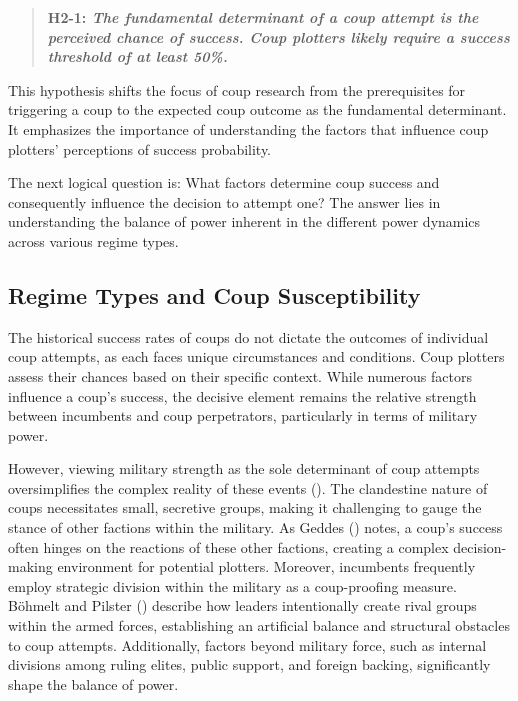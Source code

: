 \documentclass[
  12pt,
]{report}
\begin{document}
\begin{quote}
\textbf{H2-1: \emph{The fundamental determinant of a coup attempt is the
perceived chance of success. Coup plotters likely require a success
threshold of at least 50\%.}}
\end{quote}

This hypothesis shifts the focus of coup research from the prerequisites
for triggering a coup to the expected coup outcome as the fundamental
determinant. It emphasizes the importance of understanding the factors
that influence coup plotters' perceptions of success probability.

The next logical question is: What factors determine coup success and
consequently influence the decision to attempt one? The answer lies in
understanding the balance of power inherent in the different power
dynamics across various regime types.

\subsection{Regime Types and Coup
Susceptibility}\label{regime-types-and-coup-susceptibility}

The historical success rates of coups do not dictate the outcomes of
individual coup attempts, as each faces unique circumstances and
conditions. Coup plotters assess their chances based on their specific
context. While numerous factors influence a coup's success, the decisive
element remains the relative strength between incumbents and coup
perpetrators, particularly in terms of military power.

However, viewing military strength as the sole determinant of coup
attempts oversimplifies the complex reality of these events
(). The clandestine nature of coups
necessitates small, secretive groups, making it challenging to gauge the
stance of other factions within the military. As Geddes
() notes, a coup's success often hinges
on the reactions of these other factions, creating a complex
decision-making environment for potential plotters. Moreover, incumbents
frequently employ strategic division within the military as a
coup-proofing measure. Böhmelt and Pilster
() describe how leaders intentionally
create rival groups within the armed forces, establishing an artificial
balance and structural obstacles to coup attempts. Additionally, factors
beyond military force, such as internal divisions among ruling elites,
public support, and foreign backing, significantly shape the balance of
power.
\end{document}
